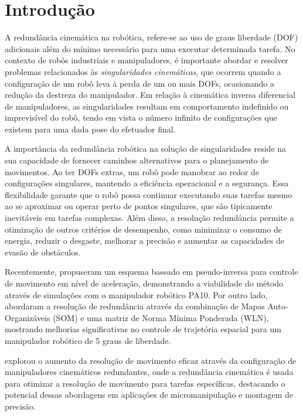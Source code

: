 \chapter{Introdução}\label{cap:introduction}

A redundância cinemática na robótica, refere-se ao uso de graus liberdade (DOF) adicionais 
além do mínimo necessário para uma executar determinada tarefa. No contexto de robôs industriais e manipuladores,
é importante abordar e resolver problemas relacionados às \emph{singularidades cinemáticas}, que ocorrem quando a 
configuração de um robô leva à perda de um ou mais DOFs, ocasionando a redução da destreza do manipulador. Em relação 
à cinemática inversa diferencial de manipuladores, as singularidades resultam em comportamento indefinido ou imprevisível do robô,
tendo em vista o número infinito de configurações que existem para uma dada pose do efetuador final.

A importância da redundância robótica na solução de singularidades reside na sua capacidade de fornecer caminhos alternativos
para o planejamento de movimentos. Ao ter DOFs extras, um robô pode manobrar ao redor de configurações singulares, mantendo a
eficiência operacional e a segurança. Essa flexibilidade garante que o robô possa continuar executando suas tarefas mesmo ao
se aproximar ou operar perto de pontos singulares, que são tipicamente inevitáveis em tarefas complexas. Além disso, 
a resolução redundância permite a otimização de outros critérios de desempenho, como minimizar o consumo de energia, reduzir o desgaste, melhorar a
precisão e aumentar as capacidades de evasão de obstáculos.

Recentemente, \cite{li2023pseudo} propuseram um esquema baseado em pseudo-inversa para controle de movimento em nível de aceleração,
demonstrando a viabilidade do método através de simulações com o manipulador robótico PA10. Por outro lado, \cite{kuri2023som}
abordaram a resolução de redundância através da combinação de Mapas Auto-Organizáveis (SOM) e uma matriz de Norma Mínima Ponderada
(WLN), mostrando melhorias significativas no controle de trajetória espacial para um manipulador robótico de 5 graus de liberdade.

\cite{hammond2011configuring} explorou o aumento da resolução de movimento eficaz através da configuração de manipuladores cinemáticos
redundantes, onde a redundância cinemática é usada para otimizar a resolução de movimento para tarefas específicas, destacando o potencial dessas
abordagens em aplicações de micromanipulação e montagem de precisão.

